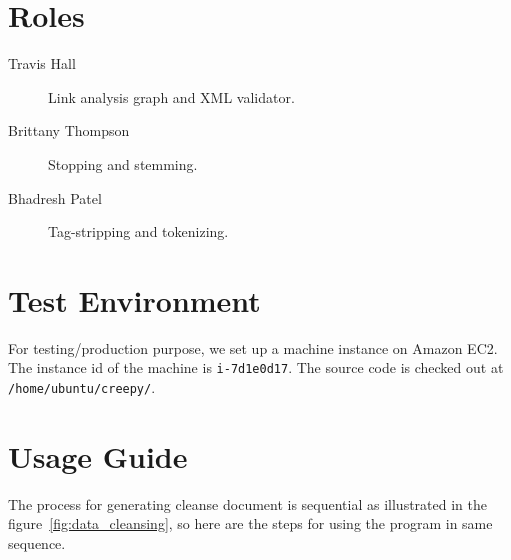 \documentclass[letterpaper,11pt,twoside]{article}
\begin{document}
\section{Roles}
\begin{description}
 \item[Travis Hall] Link analysis graph and XML validator.
 \item[Brittany Thompson] Stopping and stemming.
 \item[Bhadresh Patel] Tag-stripping and tokenizing.
\end{description}

\section{Test Environment}
For testing/production purpose, we set up a machine instance on Amazon EC2. The instance id of the machine is \texttt{i-7d1e0d17}. The source code is checked out at \texttt{/home/ubuntu/creepy/}.

\section{Usage Guide}
The process for generating cleanse document is sequential as illustrated in the figure~\ref{fig:data_cleansing}, so here are the steps for using the program in same sequence.
\end{document}
